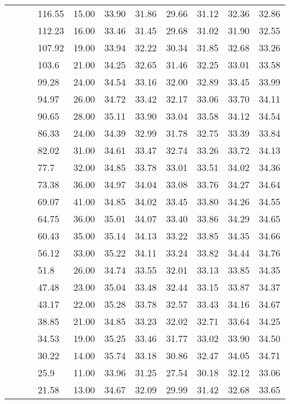 \begin{longtable}{llllrrrrrrr}
   &  &  & 116.55 & 15.00 & 33.90 & 31.86 & 29.66 & 31.12 & 32.36 & 32.86 \\ 
   &  &  & 112.23 & 16.00 & 33.46 & 31.45 & 29.68 & 31.02 & 31.90 & 32.55 \\ 
   &  &  & 107.92 & 19.00 & 33.94 & 32.22 & 30.34 & 31.85 & 32.68 & 33.26 \\ 
   &  &  & 103.6 & 21.00 & 34.25 & 32.65 & 31.46 & 32.25 & 33.01 & 33.58 \\ 
   &  &  & 99.28 & 24.00 & 34.54 & 33.16 & 32.00 & 32.89 & 33.45 & 33.99 \\ 
   &  &  & 94.97 & 26.00 & 34.72 & 33.42 & 32.17 & 33.06 & 33.70 & 34.11 \\ 
   &  &  & 90.65 & 28.00 & 35.11 & 33.90 & 33.04 & 33.58 & 34.12 & 34.54 \\ 
   &  &  & 86.33 & 24.00 & 34.39 & 32.99 & 31.78 & 32.75 & 33.39 & 33.84 \\ 
   &  &  & 82.02 & 31.00 & 34.61 & 33.47 & 32.74 & 33.26 & 33.72 & 34.13 \\ 
   &  &  & 77.7 & 32.00 & 34.85 & 33.78 & 33.01 & 33.51 & 34.02 & 34.36 \\ 
   &  &  & 73.38 & 36.00 & 34.97 & 34.04 & 33.08 & 33.76 & 34.27 & 34.64 \\ 
   &  &  & 69.07 & 41.00 & 34.85 & 34.02 & 33.45 & 33.80 & 34.26 & 34.55 \\ 
   &  &  & 64.75 & 36.00 & 35.01 & 34.07 & 33.40 & 33.86 & 34.29 & 34.65 \\ 
   &  &  & 60.43 & 35.00 & 35.14 & 34.13 & 33.22 & 33.85 & 34.35 & 34.66 \\ 
   &  &  & 56.12 & 33.00 & 35.22 & 34.11 & 33.24 & 33.82 & 34.44 & 34.76 \\ 
   &  &  & 51.8 & 26.00 & 34.74 & 33.55 & 32.01 & 33.13 & 33.85 & 34.35 \\ 
   &  &  & 47.48 & 23.00 & 35.04 & 33.48 & 32.44 & 33.15 & 33.87 & 34.37 \\ 
   &  &  & 43.17 & 22.00 & 35.28 & 33.78 & 32.57 & 33.43 & 34.16 & 34.67 \\ 
   &  &  & 38.85 & 21.00 & 34.85 & 33.23 & 32.02 & 32.71 & 33.64 & 34.25 \\ 
   &  &  & 34.53 & 19.00 & 35.25 & 33.46 & 31.77 & 33.02 & 33.90 & 34.50 \\ 
   &  &  & 30.22 & 14.00 & 35.74 & 33.18 & 30.86 & 32.47 & 34.05 & 34.71 \\ 
   &  &  & 25.9 & 11.00 & 33.96 & 31.25 & 27.54 & 30.18 & 32.12 & 33.06 \\ 
   &  &  & 21.58 & 13.00 & 34.67 & 32.09 & 29.99 & 31.42 & 32.68 & 33.65 \\ 

\end{longtable}
